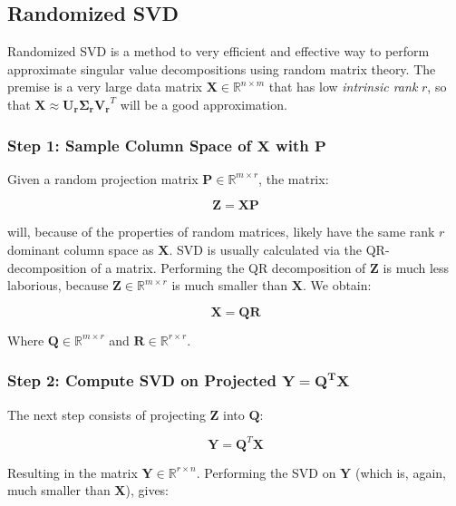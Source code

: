 \subsection{Randomized SVD}
\label{sec:rsvd}

Randomized SVD is a method to very efficient and effective way to perform approximate singular value decompositions using random matrix theory. The premise is a very large data matrix $\mathbf{X} \in \mathbb{R}^{n \times m}$ that has low \textit{intrinsic rank} $r$, so that $\mathbf{X} \approx \mathbf{U_r \Sigma_r V_r}^T$ will be a good approximation.

\subsubsection{Step 1: Sample Column Space of $\mathbf{X}$ with $\mathbf{P}$}
Given a random projection matrix $\mathbf{P}\in\mathbb{R}^{m \times r}$, the matrix:

\begin{equation}
\mathbf{Z} = \mathbf{XP}
\end{equation}

will, because of the properties of random matrices, likely have the same rank $r$  dominant column space as $\mathbf{X}$. SVD is usually calculated via the QR-decomposition of a matrix. Performing the QR decomposition of $\mathbf{Z}$ is much less laborious, because $\mathbf{Z}\in\mathbb{R}^{m \times r}$ is much smaller than $\mathbf{X}$. We obtain:

\begin{equation}
\mathbf{X} = \mathbf{QR}
\end{equation}

Where $\mathbf{Q}\in\mathbb{R}^{m \times r}$ and $\mathbf{R}\in\mathbb{R}^{r \times r}$.


\subsubsection{Step 2: Compute SVD on Projected $\mathbf{Y = Q^T X}$}
The next step consists of projecting $\mathbf{Z}$ into $\mathbf{Q}$:

\begin{equation}
\mathbf{Y} = \mathbf{Q}^T\mathbf{X}
\end{equation}

Resulting in the matrix $\mathbf{Y}\in\mathbb{R}^{r\times n}$. Performing the SVD on $\mathbf{Y}$ (which is, again, much smaller than $\mathbf{X}$), gives:

